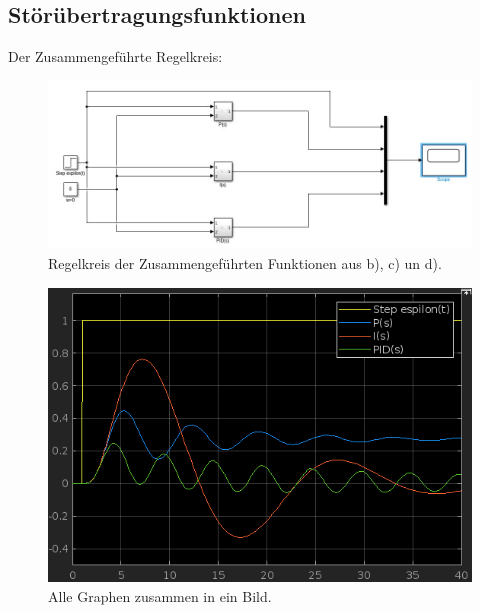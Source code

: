 \documentclass{article}
\begin{document}
		\subsection{Störübertragungsfunktionen}
			Der Zusammengeführte Regelkreis:
			\begin{figure}[h]
				\includegraphics[scale = 0.4, center]{4_d_Blockschaltbild_alle_zusammen.png}
				\caption{Regelkreis der Zusammengeführten Funktionen aus b), c) un d).}
				\label{fig37:4_d_alle_Regelkreise}
			\end{figure}
			\begin{figure}[h]
				\includegraphics[scale = 0.5, center]{4_d_alle_Graphen.png}
				\caption{Alle Graphen zusammen in ein Bild.}
				\label{fig37:4_d_alle_Regelkreise}
			\end{figure}
				
				
				
				
				
\end{document}
